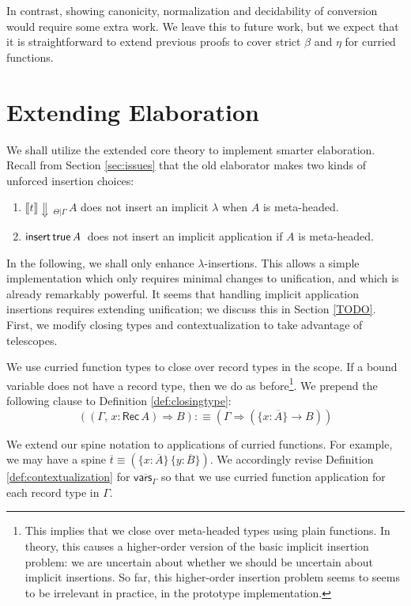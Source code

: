 \documentclass[acmsmall,review,anonymous,prologue,dvipsnames]{acmart}\settopmatter{printfolios=true,printccs=false,printacmref=false}
\newcommand{\To}{\Rightarrow}
\newcommand{\echeck}[4]{\llbracket#1\rrbracket\!\Downarrow\,_{#2|#3}\,#4}
\newcommand{\true}{\mathsf{true}}
\newcommand{\einsert}[3]{\mathsf{insert}\,#1\,#2\,#3}
\newcommand{\Rec}{\mathsf{Rec}}
\newcommand{\ol}[1]{\overline{#1}}
\theoremstyle{remark}
\begin{document}
In contrast, showing canonicity, normalization and decidability of conversion
would require some extra work. We leave this to future work, but we expect that
it is straightforward to extend previous proofs to cover strict $\beta$ and
$\eta$ for curried functions.

\section{Extending Elaboration}
\label{sec:extending_elaboration}

We shall utilize the extended core theory to implement smarter
elaboration. Recall from Section \ref{sec:issues} that the old elaborator makes
two kinds of unforced insertion choices:
\begin{enumerate}
\item $\echeck{t}{\Theta}{\Gamma}{A}$ does not insert an implicit $\lambda$ when $A$ is meta-headed.
\item $\einsert{\true}{A}$ does not insert an implicit application if $A$ is meta-headed.
\end{enumerate}
In the following, we shall only enhance $\lambda$-insertions. This allows a
simple implementation which only requires minimal changes to unification, and
which is already remarkably powerful. It seems that handling implicit
application insertions requires extending unification; we discuss this in
Section \ref{TODO}. First, we modify closing types and contextualization to take
advantage of telescopes.

\begin{definition}
We use curried function types to close over record types in the scope. If a
bound variable does not have a record type, then we do as before\footnote{This
  implies that we close over meta-headed types using plain functions. In theory,
  this causes a higher-order version of the basic implicit insertion problem: we
  are uncertain about whether we should be uncertain about implicit
  insertions. So far, this higher-order insertion problem seems to seems to be
  irrelevant in practice, in the prototype implementation.}. We prepend the
following clause to Definition
\ref{def:closingtype}:
\[
  ((\Gamma,\, x : \Rec\,A) \To B) :\equiv (\Gamma \To (\{x : \ol{A}\} \to B))
\]
\end{definition}
\begin{definition}[Contextualization]
We extend our spine notation to applications of curried functions. For example,
we may have a spine $\ol{t} \equiv (\{x : \ol{A}\}\,\{y : \ol{B}\})$. We
accordingly revise Definition \ref{def:contextualization} for
$\overline{\mathsf{vars}_{\Gamma}}$ so that we use curried function application
for each record type in $\Gamma$.
\end{definition}
\end{document}
